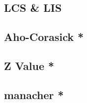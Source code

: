 \documentclass[a4paper,10pt,twocolumn,oneside]{article}
\begin{document}
\subsection{LCS \& LIS}


% 

% 

\subsection{Aho-Corasick *}


\subsection{Z Value *}


% 

\subsection{manacher *}


% 

%

% 
\end{document}
